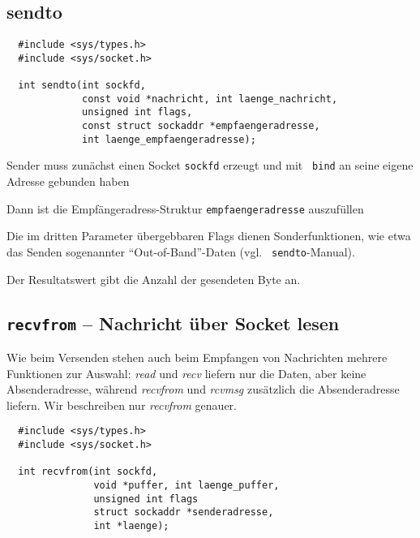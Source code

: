 \documentclass[12pt,utf8]{article}
\begin{document}
\subsection*{sendto}
\begin{verbatim}
  #include <sys/types.h>
  #include <sys/socket.h>

  int sendto(int sockfd,
             const void *nachricht, int laenge_nachricht,
             unsigned int flags,
             const struct sockaddr *empfaengeradresse,
             int laenge_empfaengeradresse);

\end{verbatim}

\begin{titemize}
\item Sender muss zunächst einen Socket {\tt sockfd} erzeugt und mit {\tt
bind} an seine eigene Adresse gebunden haben
\item Dann ist die
Empfängeradress-Struktur {\tt empfaengeradresse} auszufüllen
\item Die im dritten Parameter übergebbaren Flags dienen Sonderfunktionen,
wie etwa das Senden sogenannter "`Out-of-Band"'-Daten (vgl. {\tt
sendto}-Manual).
\item Der Resultatswert gibt die Anzahl der gesendeten Byte an.

\end{titemize}


\subsection*{{\tt recvfrom} -- Nachricht über Socket lesen}

Wie beim Versenden stehen auch beim Empfangen von Nachrichten mehrere
Funktionen zur Auswahl: {\em read\/} und {\em recv\/} liefern nur die Daten,
aber keine Absenderadresse, während {\em recvfrom\/} und {\em rcvmsg\/}
zusätzlich die Absenderadresse liefern.
Wir beschreiben nur {\em recvfrom\/} genauer.

\begin{verbatim}
  #include <sys/types.h>
  #include <sys/socket.h>

  int recvfrom(int sockfd,
               void *puffer, int laenge_puffer,
               unsigned int flags
               struct sockaddr *senderadresse,
               int *laenge);
\end{verbatim}
\end{document}
